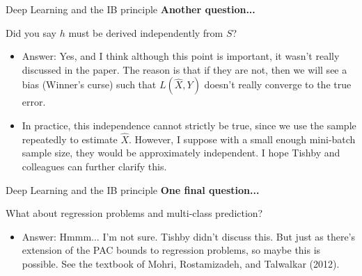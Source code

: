 \documentclass{beamer}
\begin{document}
\begin{frame}{Deep Learning and the IB principle}
\textbf{Another question...} 

Did you say $h$ must be derived independently from $S$? 
\begin{itemize}
	\item Answer: Yes, and I think although this point is important, it wasn't really discussed in the paper. The reason is that if they are not, then we will see a bias (Winner's curse) such that $L(\hat{X}, Y)$ doesn't really converge to the true error. 
	\item In practice, this independence cannot strictly be true, since we use the sample repeatedly to estimate $\hat{X}$. However, I suppose with a small enough mini-batch sample size, they would be approximately independent. I hope Tishby and colleagues can further clarify this. 
\end{itemize}
\end{frame}

\begin{frame}{Deep Learning and the IB principle}
\textbf{One final question...} 

What about regression problems and multi-class prediction? 
\begin{itemize}
	\item Answer: Hmmm... I'm not sure. Tishby didn't discuss this. But just as there's extension of the PAC bounds to regression problems, so maybe this is possible. See the textbook of Mohri, Rostamizadeh, and Talwalkar (2012).  %
\end{itemize}
\end{frame}
\end{document}
